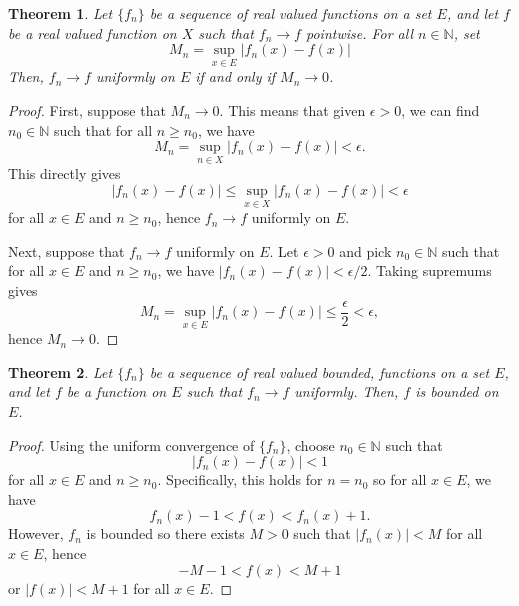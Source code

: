 \documentclass[11pt]{article}
\def\N{\mathbb{N}}
\newtheorem{theorem}{Theorem}[section]
\theoremstyle{definition}
\theoremstyle{remark}
\begin{document}
    \begin{theorem} \label{theo:uniform_M_n}
        Let $\{f_n\}$ be a sequence of real valued functions on a set $E$,
        and let $f$ be a real valued function on $X$ such that $f_n \to f$ pointwise.
        For all $n \in \N$, set \[
            M_n = \sup_{x \in E} |f_n(x) - f(x)|
        \] Then, $f_n \to f$ uniformly on $E$ if and only if $M_n \to 0$.
    \end{theorem}
    \begin{proof}
        First, suppose that $M_n \to 0$. This means that given $\epsilon > 0$, we can
        find $n_0 \in \N$ such that for all $n \geq n_0$, we have \[
            M_n = \sup_{n \in X}|f_n(x) - f(x)| < \epsilon.
        \] This directly gives \[
            |f_n(x) - f(x)| \leq \sup_{x \in X}|f_n(x) - f(x)| < \epsilon
        \] for all $x \in E$ and $n \geq n_0$, hence $f_n \to f$ uniformly on $E$.

        Next, suppose that $f_n \to f$ uniformly on $E$. Let $\epsilon > 0$ and pick
        $n_0 \in \N$ such that for all $x \in E$ and $n \geq n_0$, we have $|f_n(x) -
        f(x)| < \epsilon / 2$. Taking supremums gives \[
            M_n = \sup_{x \in E}|f_n(x) - f(x)| \leq \frac{\epsilon}{2} < \epsilon,
        \] hence $M_n \to 0$.
    \end{proof}

    \begin{theorem} \label{theo:uniform_bounded}
        Let $\{f_n\}$ be a sequence of real valued bounded, functions on a set $E$,
        and let $f$ be a function on $E$ such that $f_n \to f$ uniformly.  Then, $f$
        is bounded on $E$.
    \end{theorem}
    \begin{proof}
        Using the uniform convergence of $\{f_n\}$, choose $n_0 \in \N$ such that \[
            |f_n(x) - f(x)| < 1
        \] for all $x \in E$ and $n \geq n_0$. Specifically, this holds for $n =
        n_0$ so for all $x \in E$, we have \[
            f_n(x) - 1 < f(x) < f_n(x) + 1.
        \] However, $f_n$ is bounded so there exists $M > 0$ such that $|f_n(x)| < M$
        for all $x \in E$, hence \[
            -M - 1 < f(x) < M + 1
        \] or $|f(x)| < M + 1$ for all $x \in E$.
    \end{proof}
\end{document}
